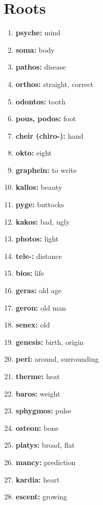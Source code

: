 \documentclass{article}
\begin{document}
\section{Roots}
\begin{enumerate}
    \item \textbf{psyche: }{mind}
    \item \textbf{soma: }{body}
    \item \textbf{pathos: }{disease}
    \item \textbf{orthos: }{straight, correct}
    \item \textbf{odontos: }{tooth}
    \item \textbf{pous, podos: }{foot}
    \item \textbf{cheir (chiro-): }{hand}
    \item \textbf{okto: }{eight}
    \item \textbf{graphein: }{to write}
    \item \textbf{kallos: }{beauty}
    \item \textbf{pyge: }{buttocks}
    \item \textbf{kakos: }{bad, ugly}
    \item \textbf{photos: }{light}
    \item \textbf{tele-: }{distance}
    \item \textbf{bios: }{life}
    \item \textbf{geras: }{old age}
    \item \textbf{geron: }{old man}
    \item \textbf{senex: }{old}
    \item \textbf{genesis: }{birth, origin}
    \item \textbf{peri: }{around, surrounding}
    \item \textbf{therme: }{heat}
    \item \textbf{baros: }{weight}
    \item \textbf{sphygmos: }{pulse}
    \item \textbf{osteon: }{bone}
    \item \textbf{platys: }{broad, flat}
    \item \textbf{mancy: }{prediction}
    \item \textbf{kardia: }{heart}
    \item \textbf{escent: }{growing}
    
\end{enumerate}
\end{document}
